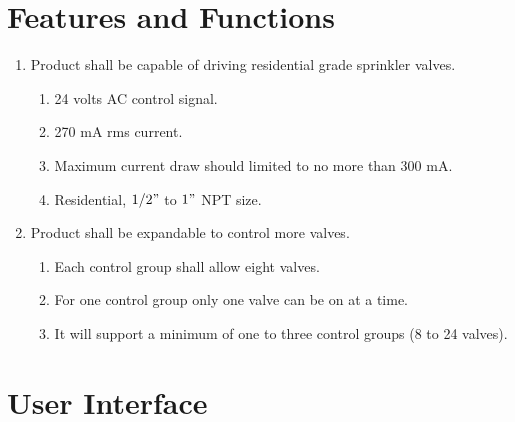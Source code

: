 \documentclass[12pt,letterpaper]{article}
\begin{document}

\pagebreak

\section{Features and Functions}

\begin{enumerate}
\item Product shall be capable of driving residential grade sprinkler valves.
	\begin{enumerate}
	\item 24 volts AC control signal.
	\item 270 mA rms current.
	\item Maximum current draw should limited to no more than 300 mA.
	\item Residential, $1/2"$ to $1"$ NPT size.
	\end{enumerate}

\item Product shall be expandable to control more valves.
	\begin{enumerate}
	\item Each control group shall allow eight valves.
	\item For one control group only one valve can be on at a time.
	\item It will support a minimum of one to three control groups
		(8 to 24 valves).
	\end{enumerate}

\end{enumerate}

\section{User Interface}
\end{document}
